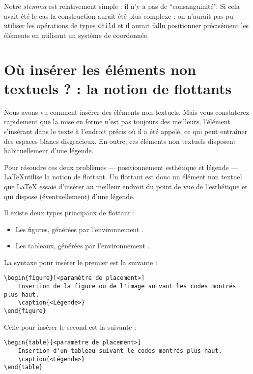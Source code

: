 Notre \emph{stemma} est relativement simple : il n'y a pas de \enquote{consanguinité}. Si cela avait été le cas la construction aurait été plus complexe : on n'aurait pas pu utiliser les opérations de types \verb|child| et il aurait fallu positionner précisément les éléments en utilisant un système de coordonnée.





\section[La notion de flottants]{Où insérer les éléments non textuels ? : la notion de flottants}
\label{legende}
Nous avons vu comment insérer des éléments non textuels. Mais vous constaterez rapidement que la mise en forme n'est pas toujours des meilleurs, l'élément s'insérant dans le texte à l'endroit précis où il a été appelé, ce qui peut entraîner des espaces blancs disgracieux.
En outre, ces éléments non textuels disposent habituellement d'une légende.

Pour résoudre ces deux problèmes --- positionnement esthétique et légende --- \LaTeX utilise la notion de flottant. Un flottant est donc un élément non textuel que LaTeX essaie d'insérer au meilleur endroit du point de vue de l'esthétique et qui dispose (éventuellement) d'une légende.

Il existe deux types principaux de flottant :
\begin{itemize}
	\item Les figures, générées par l'environnement .
	\item Les tableaux, générées par l'environnement .
\end{itemize}

La syntaxe pour insérer le premier est la suivante :

\begin{verbatim}
\begin{figure}[<paramètre de placement>]
	Insertion de la figure ou de l'image suivant les codes montrés plus haut.
	\caption{<Légende>}
\end{figure} 
\end{verbatim}

Celle pour insérer le second est la suivante :
\begin{verbatim}
\begin{table}[<paramètre de placement>]
	Insertion d'un tableau suivant le codes montrés plus haut.
	\caption{<Légende>}
\end{table} 
\end{verbatim}

